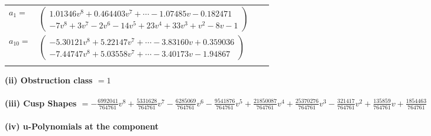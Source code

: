 \documentclass[1p]{elsarticle_modified}
\theoremstyle{definition}
\begin{document}
\begin{tabular}{m{7pt} m{180pt} m{7pt} m{180pt} }
\flushright $a_{1}=$&$\begin{pmatrix}1.01346 v^{8}+0.464403 v^{7}+\cdots-1.07485 v-0.182471\\-7 v^8+3 v^7-2 v^6-14 v^5+23 v^4+33 v^3+v^2-8 v-1\end{pmatrix}$ \\
\flushright $a_{10}=$&$\begin{pmatrix}-5.30121 v^{8}+5.22147 v^{7}+\cdots-3.83160 v+0.359036\\-7.44747 v^{8}+5.03558 v^{7}+\cdots-3.40173 v-1.94867\end{pmatrix}$\\&\end{tabular}
\flushleft \textbf{(ii) Obstruction class $= 1$}\\~\\
\flushleft \textbf{(iii) Cusp Shapes $= -\frac{6992041}{764761} v^8+\frac{5331628}{764761} v^7-\frac{6285069}{764761} v^6-\frac{9541876}{764761} v^5+\frac{21850087}{764761} v^4+\frac{25370276}{764761} v^3-\frac{321417}{764761} v^2+\frac{135859}{764761} v+\frac{1854463}{764761}$}\\~\\
\newpage\renewcommand{\arraystretch}{1}
\flushleft \textbf{(iv) u-Polynomials at the component}\newline \\
\end{document}

